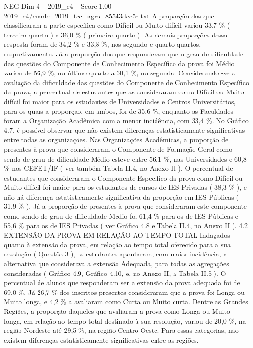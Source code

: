\begin{textsample}{NEG Dim 4 – 2019\_c4 – Score 1.00 – 2019\_c4/enade\_2019\_tec\_agro\_85543dcc5c.txt}
A proporção dos que classificaram a parte específica como Difícil ou Muito difícil variou 33,7 \% ( terceiro quarto ) a 36,0 \% ( primeiro quarto ).
As demais proporções dessa resposta foram de 34,2 \% e 33,8 \%, nos segundo e quarto quartos, respectivamente.
Já a proporção dos que responderam que o grau de dificuldade das questões do Componente de Conhecimento Específico da prova foi Médio variou de 56,9 \%, no último quarto a 60,1 \%, no segundo.
Considerando -se a avaliação da dificuldade das questões do Componente de Conhecimento Específico da prova, o percentual de estudantes que as consideraram como Difícil ou Muito difícil foi maior para os estudantes de Universidades e Centros Universitários, para os quais a proporção, em ambos, foi de 35,6 \%, enquanto as Faculdades foram a Organização Acadêmica com a menor incidência, com 33,4 \%.
No Gráfico 4.7, é possível observar que não existem diferenças estatisticamente significativas entre todas as organizações.
Nas Organizações Acadêmicas, a proporção de presentes à prova que consideraram o Componente de Formação Geral como sendo de grau de dificuldade Médio esteve entre 56,1 \%, nas Universidades e 60,8 \% nos CEFET/IF ( ver também Tabela II.4, no Anexo II ).
O percentual de estudantes que consideraram o Componente Específico da prova como Difícil ou Muito difícil foi maior para os estudantes de cursos de IES Privadas ( 38,3 \% ), e não há diferença estatisticamente significativa da proporção em IES Públicas ( 31,9 \% ).
Já a proporção de presentes à prova que consideraram este componente como sendo de grau de dificuldade Médio foi 61,4 \% para os de IES Públicas e 55,6 \% para os de IES Privadas ( ver Gráfico 4.8 e Tabela II.4, no Anexo II ). 4.2 EXTENSÃO DA PROVA EM RELAÇÃO AO TEMPO TOTAL Indagados quanto à extensão da prova, em relação ao tempo total oferecido para a sua resolução ( Questão 3 ), os estudantes apontaram, com maior incidência, a alternativa que considerava a extensão Adequada, para todas as agregações consideradas ( Gráfico 4.9, Gráfico 4.10, e, no Anexo II, a Tabela II.5 ).
O percentual de alunos que responderam ser a extensão da prova adequada foi de 69,0 \%.
Já 26,7 \% dos inscritos presentes consideraram que a prova foi Longa ou Muito longa, e 4,2 \% a avaliaram como Curta ou Muito curta.
Dentre as Grandes Regiões, a proporção daqueles que avaliaram a prova como Longa ou Muito longa, em relação ao tempo total destinado à sua resolução, variou de 20,0 \%, na região Nordeste até 29,5 \%, na região Centro-Oeste.
Para essas categorias, não existem diferenças estatisticamente significativas entre as regiões.

\end{textsample}

